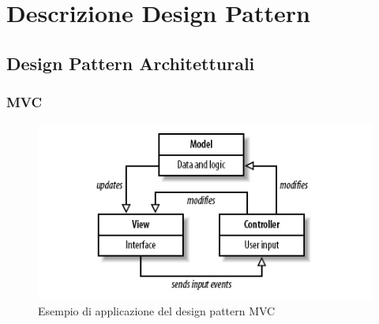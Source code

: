 \documentclass{scalatekids-article}
\begin{document}
\newpage
\appendix
\label{sec:appendice}

\section{Descrizione Design Pattern}

\subsection{Design Pattern Architetturali}

\subsubsection{MVC}
\begin{figure}[H]
  \begin{center}
    \includegraphics[width=0.9 \textwidth, keepaspectratio]{img/designPattern/mvc.jpg}
    \caption{Esempio di applicazione del design pattern MVC}
  \end{center}
\end{figure}
\end{document}
